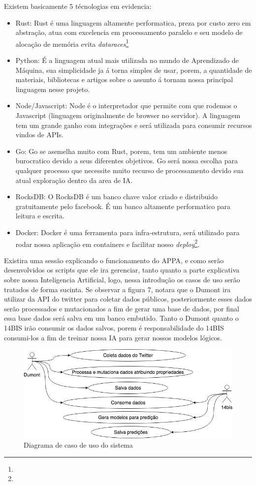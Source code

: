 Existem basicamente 5 técnologias em evidencia:
\begin{itemize}
 \item Rust: Rust é uma linguagem altamente performatica, preza por custo zero em abstração, atua com excelencia em processamento paralelo e seu modelo de alocação de memória evita \textit{dataraces}\footnote{}
 \item Python: É a linguagem atual mais utilizada no mundo de Aprendizado de Máquina, sua simplicidade ja á torna simples de usar, porem, a quantidade de materiais, bibliotecas e artigos sobre o assunto á tornam nossa principal linguagem nesse projeto.
 \item Node/Javascript: Node é o interpretador que permite com que rodemos o Javascript (linguagem originalmente de browser no servidor). A linguagem tem um grande ganho com integrações e será utilizada para consumir recursos vindos de APIs.
 \item Go: Go se asemelha muito com Rust, porem, tem um ambiente menos burocratico devido a seus diferentes objetivos. Go será nossa escolha para qualquer processo que necessite muito recurso de processamento devido sua atual exploração dentro da area de IA.
 \item RocksDB: O RocksDB é um banco chave valor criado e distribuido gratuitamente pelo facebook. É um banco altamente performatico para leitura e escrita.
 \item Docker: Docker é uma ferramenta para infra-estrutura, será utilizado para rodar nossa aplicação em containers e facilitar nosso \textit{deploy}\footnote{}.
\end{itemize}

Existira uma sessão explicando o funcionamento do APPA, e como serão desenvolvidos os scripts que ele ira gerenciar, tanto quanto a parte explicativa sobre nossa Inteligencia Artificial, logo, nessa introdução os casos de uso serão tratados de forma sucinta. Se observar a figura 7, notara que o Dumont ira utilizar da API do twitter para coletar dados públicos, posteriormente esses dados serão processados e mutacionados a fim de gerar uma base de dados, por final essa base dados será salva em um banco embutido. Tanto o Dumont quanto o 14BIS irão consumir os dados salvos, porem é responsabilidade do 14BIS consumi-los a fim de treinar nossa IA para gerar nossos modelos lógicos.

\begin{figure}
    \centering
    \includegraphics[width=.8\textwidth]{imagens/tcc_caso_de_uso.png}
    \caption{Diagrama de caso de uso do sistema}
    \label{fig:tcc_caso_de_uso}
\end{figure}

